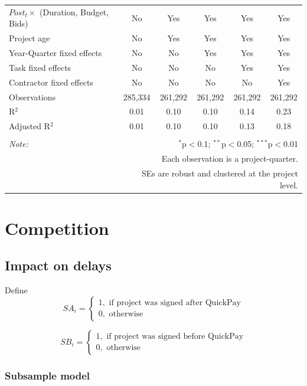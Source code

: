 \documentclass[
]{article}
\begin{document}
\begin{table}[H]
\begin{tabular}{@{\extracolsep{-2pt}}lccccc}
$Post_t \times $  (Duration, Budget, Bids) & No & Yes & Yes & Yes & Yes \\ 
Project age & No & Yes & Yes & Yes & Yes \\ 
Year-Quarter fixed effects & No & No & Yes & Yes & Yes \\ 
Task fixed effects & No & No & No & Yes & Yes \\ 
Contractor fixed effects & No & No & No & No & Yes \\ 
Observations & 285,334 & 261,292 & 261,292 & 261,292 & 261,292 \\ 
R$^{2}$ & 0.01 & 0.10 & 0.10 & 0.14 & 0.23 \\ 
Adjusted R$^{2}$ & 0.01 & 0.10 & 0.10 & 0.13 & 0.18 \\ 
\hline 
\hline \\[-1.8ex] 
\textit{Note:}  & \multicolumn{5}{r}{$^{*}$p$<$0.1; $^{**}$p$<$0.05; $^{***}$p$<$0.01} \\ 
 & \multicolumn{5}{r}{Each observation is a project-quarter.} \\ 
 & \multicolumn{5}{r}{SEs are robust and clustered at the project level.} \\ 
\end{tabular} 
\end{table}

\hypertarget{competition}{%
\section{Competition}\label{competition}}

\hypertarget{impact-on-delays}{%
\subsection{Impact on delays}\label{impact-on-delays}}

Define
\[ SA_i = \begin{cases} 1, \text{ if project was signed after QuickPay}\\
0, \text{ otherwise} \end{cases}\]

\[ SB_i = \begin{cases} 1, \text{ if project was signed before QuickPay}\\
0, \text{ otherwise} \end{cases}\]

\hypertarget{subsample-model}{%
\subsubsection{Subsample model}\label{subsample-model}}
\end{document}
